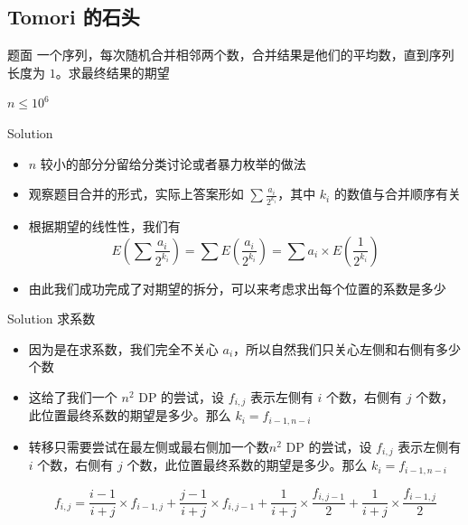 ﻿\documentclass[aspectratio=169]{ctexbeamer}
\begin{document}
\subsection{Tomori 的石头}
\begin{frame}{题面}
    一个序列，每次随机合并相邻两个数，合并结果是他们的平均数，直到序列长度为 $ 1 $。求最终结果的期望

    $n\le 10^6$
\end{frame}

\begin{frame}{Solution}
    \begin{itemize}
        \item $n$ 较小的部分分留给分类讨论或者暴力枚举的做法
        \item 观察题目合并的形式，实际上答案形如 $\sum \frac{a_i}{2^{k_i}}$，其中 $k_i$ 的数值与合并顺序有关
        \item 根据期望的线性性，我们有
        $$
            E\left(\sum \dfrac{a_i}{2^{k_i}}\right)=\sum E\left(\dfrac{a_i}{2^{k_i}}\right)=\sum a_i\times E\left(\dfrac{1}{2^{k_i}}\right)
        $$
        \item 由此我们成功完成了对期望的拆分，可以来考虑求出每个位置的系数是多少
    \end{itemize}
\end{frame}

\begin{frame}{Solution}
    求系数
    \begin{itemize}
        \item 因为是在求系数，我们完全不关心 $a_i$，所以自然我们只关心左侧和右侧有多少个数
        \item 这给了我们一个 $n^2$ DP 的尝试，设 $f_{i,j}$ 表示左侧有 $i$ 个数，右侧有 $j$ 个数，此位置最终系数的期望是多少。那么 $k_i=f_{i-1,n-i}$
        \item 转移只需要尝试在最左侧或最右侧加一个数$n^2$ DP 的尝试，设 $f_{i,j}$ 表示左侧有 $i$ 个数，右侧有 $j$ 个数，此位置最终系数的期望是多少。那么 $k_i=f_{i-1,n-i}$

        $$
            f_{i,j}=\frac{i-1}{i+j}\times f_{i-1,j}+\frac{j-1}{i+j}\times f_{i,j-1}+\frac{1}{i+j}\times \frac{f_{i,j-1}}{2}+\frac{1}{i+j}\times \frac{f_{i-1,j}}{2}
        $$
    \end{itemize}
\end{frame}
\end{document}
